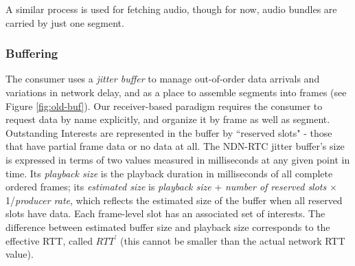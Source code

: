 \documentclass{icn/sig-alternate-2013} %
\newcommand{\ndnrtcName}{NDN-RTC} %
\begin{document}
A similar process is used for fetching audio, though for now, audio bundles are carried by just one segment.


\subsubsection{Buffering}


The consumer uses a \textit{jitter buffer} to manage out-of-order data arrivals and variations in network delay, and as a place to assemble segments into frames (see Figure \ref{fig:old-buf}). %
Our receiver-based paradigm requires the consumer to request data by name explicitly, and organize it by frame as well as segment. %
Outstanding Interests are represented in the buffer by ``reserved slots" - those that have partial frame data or no data at all.
The \ndnrtcName{} jitter buffer's size is expressed in terms of two values measured in milliseconds at any given point in time. Its \textit{playback size} is the playback duration in milliseconds of all complete ordered frames; its \textit{estimated size} is \textit{playback size} + \textit{number of reserved slots} $\times$ 1/\textit{producer rate}, which reflects the estimated size of the buffer when all reserved slots have data. Each frame-level slot has an associated set of interests. 
The difference between estimated buffer size and playback size corresponds to the effective RTT, called $RTT^{\prime}$ (this cannot be smaller than the actual network RTT value). %
\end{document}
